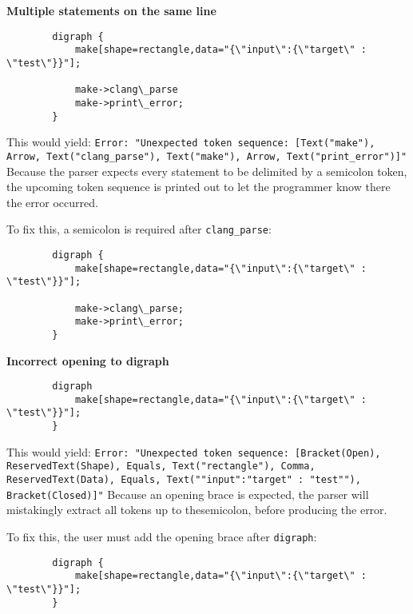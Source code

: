 \documentclass{article}
\begin{document}
		\textbf{Multiple statements on the same line}
		\begin{verbatim}
		digraph {
		    make[shape=rectangle,data="{\"input\":{\"target\" : \"test\"}}"];
    
		    make->clang\_parse
		    make->print\_error;
		}
    	\end{verbatim}

		This would yield: \texttt{Error: "Unexpected token sequence: [Text("make"), Arrow, Text("clang\_parse"), Text("make"), Arrow, Text("print\_error")]"}
		Because the parser expects every statement to be delimited by a semicolon token, the upcoming token sequence is printed out to let the programmer know there the error occurred.

		To fix this, a semicolon is required after \texttt{clang\_parse}:
		\begin{verbatim}
		digraph {
		    make[shape=rectangle,data="{\"input\":{\"target\" : \"test\"}}"];
    
		    make->clang\_parse;
		    make->print\_error;
		}
    	\end{verbatim}

		

		\textbf{Incorrect opening to digraph}
		\begin{verbatim}
		digraph 
		    make[shape=rectangle,data="{\"input\":{\"target\" : \"test\"}}"];
		}
		\end{verbatim}
		This would yield: \texttt{Error: "Unexpected token sequence: [Bracket(Open), ReservedText(Shape), Equals, Text("rectangle"), Comma, ReservedText(Data), Equals, Text("{"input":{"target" : "test"}}"), Bracket(Closed)]"}
		Because an opening brace is expected, the parser will mistakingly extract all tokens up to thesemicolon, before producing the error.

		To fix this, the user must add the opening brace after \texttt{digraph}:

		\begin{verbatim}
		digraph {
		    make[shape=rectangle,data="{\"input\":{\"target\" : \"test\"}}"];
		}
		\end{verbatim}		
\end{document}
